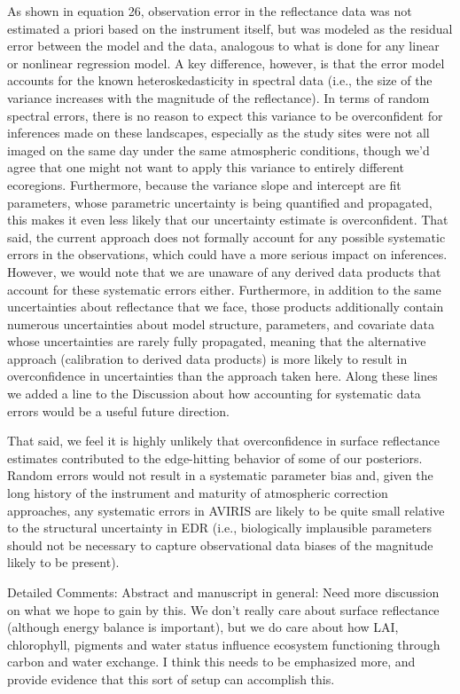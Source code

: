 As shown in equation 26, observation error in the reflectance data was not estimated a priori based on the instrument itself, but was modeled as the residual error between the model and the data, analogous to what is done for any linear or nonlinear regression model.
A key difference, however, is that the error model accounts for the known heteroskedasticity in spectral data (i.e., the size of the variance increases with the magnitude of the reflectance).
In terms of random spectral errors, there is no reason to expect this variance to be overconfident for inferences made on these landscapes, especially as the study sites were not all imaged on the same day under the same atmospheric conditions, though we’d agree that one might not want to apply this variance to entirely different ecoregions.
Furthermore, because the variance slope and intercept are fit parameters, whose parametric uncertainty is being quantified and propagated, this makes it even less likely that our uncertainty estimate is overconfident.
That said, the current approach does not formally account for any possible systematic errors in the observations, which could have a more serious impact on inferences.
However, we would note that we are unaware of any derived data products that account for these systematic errors either.
Furthermore, in addition to the same uncertainties about reflectance that we face, those products additionally contain numerous uncertainties about model structure, parameters, and covariate data whose uncertainties are rarely fully propagated, meaning that the alternative approach (calibration to derived data products) is more likely to result in overconfidence in uncertainties than the approach taken here.
Along these lines we added a line to the Discussion about how accounting for systematic data errors would be a useful future direction.

That said, we feel it is highly unlikely that overconfidence in surface reflectance estimates contributed to the edge-hitting behavior of some of our posteriors.
Random errors would not result in a systematic parameter bias and, given the long history of the instrument and maturity of atmospheric correction approaches, any systematic errors in AVIRIS are likely to be quite small relative to the structural uncertainty in EDR (i.e., biologically implausible parameters should not be necessary to capture observational data biases of the magnitude likely to be present).

\begin{reviewer}
  Detailed Comments:
  Abstract and manuscript in general: Need more discussion on what we hope to gain by this. We don’t really care about surface reflectance (although energy balance is important), but we do care about how LAI, chlorophyll, pigments and water status influence ecosystem functioning through carbon and water exchange. I think this needs to be emphasized more, and provide evidence that this sort of setup can accomplish this.
\end{reviewer}

